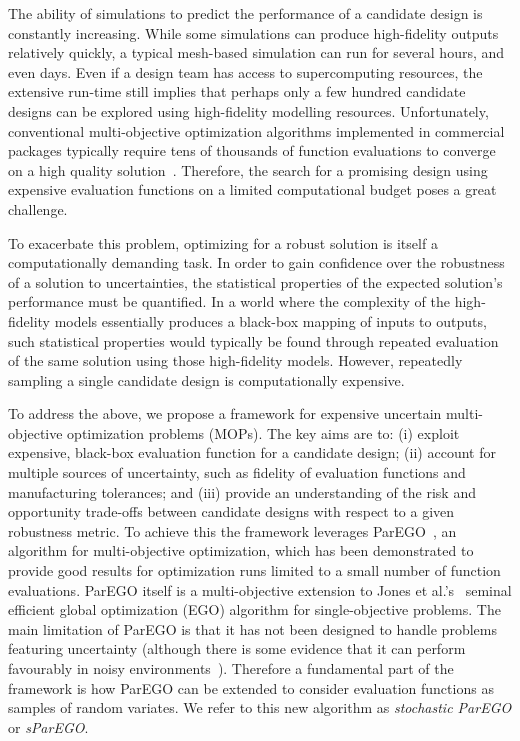 \documentclass{llncs}
\begin{document}
The ability of simulations to predict the performance of a candidate design is constantly increasing. While some simulations can produce high-fidelity outputs relatively quickly, a typical mesh-based simulation can run for several hours, and even days. Even if a design team has access to supercomputing resources, the extensive run-time still implies that perhaps only a few hundred candidate designs can be explored using high-fidelity modelling resources. Unfortunately, conventional multi-objective optimization algorithms implemented in commercial packages typically require tens of thousands of function evaluations to converge on a high quality solution~\cite{Zhou2011Multiobjective}. Therefore, the search for a promising design using expensive evaluation functions on a limited computational budget poses a great challenge.

To exacerbate this problem, optimizing for a robust solution is itself a computationally demanding task. In order to gain confidence over the robustness of a solution to uncertainties, the statistical properties of the expected solution's performance must be quantified. In a world where the complexity of the high-fidelity models essentially produces a black-box mapping of inputs to outputs, such statistical properties would typically be found through repeated evaluation of the same solution using those high-fidelity models. However, repeatedly sampling a single candidate design is computationally expensive.

To address the above, we propose a framework for expensive uncertain multi-objective optimization problems (MOPs). The key aims are to: (i) exploit expensive, black-box evaluation function for a candidate design; (ii) account for multiple sources of uncertainty, such as fidelity of evaluation functions and manufacturing tolerances; and (iii) provide an understanding of the risk and opportunity trade-offs between candidate designs with respect to a given robustness metric. To achieve this the framework leverages ParEGO~\cite{Knowles2006ParEGO}, an algorithm for multi-objective optimization, which has been demonstrated to provide good results for optimization runs limited to a small number of function evaluations. ParEGO itself is a multi-objective extension to Jones et al.'s~\cite{Jones1998Efficient} seminal efficient global optimization (EGO) algorithm for single-objective problems. The main limitation of ParEGO is that it has not been designed to handle problems featuring uncertainty (although
there is some evidence that it can perform favourably in noisy environments~\cite{knowles2009noisy}). Therefore a fundamental part of the framework is how ParEGO can be extended to consider evaluation functions as samples of random variates. We refer to this new algorithm as \emph{stochastic ParEGO} or \emph{sParEGO}. 
\end{document}
